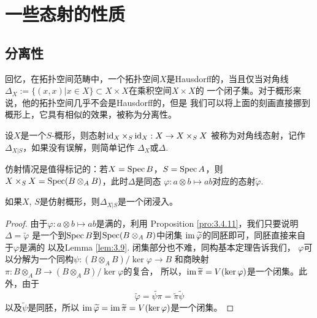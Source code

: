 
\chapter{一些态射的性质}

\section{分离性}

回忆，在拓扑空间范畴中，一个拓扑空间$X$是Hausdorff的，当且仅当对角线
$\Delta_X:=\{(x,x)|x\in X\}\subset X\times X$在乘积空间$X\times X$的
一个闭子集。对于概形来说，他的拓扑空间几乎不会是Hausdorff的，但是
我们可以将上面的刻画直接挪到概形上，它具有相似的效果，被称为分离性。

\begin{para}[对角线]
	设$X$是一个$S$-概形，则态射$\operatorname{id}_X\times_S\operatorname{id}_X:X\to X\times_S X$
	被称为对角线态射，记作$\Delta_{X|S}$，如果没有误解，则简单记作
	$\Delta_X$或$\Delta$.
\end{para}

仿射情况是值得标记的：若$X=\operatorname{Spec} B$，$S=\operatorname{Spec} A$，则
$X\times_S X=\operatorname{Spec} (B\otimes_A B)$，此时$\Delta$是同态
$\varphi:a\otimes b\mapsto ab$对应的态射$\widetilde{\varphi}$.

\begin{lem}\label{lem:4.1.2}
	如果$X$, $S$是仿射概形，则$\Delta_{X|S}$是一个闭浸入。
\end{lem}

\begin{proof}
由于$\varphi:a\otimes b\mapsto ab$是满的，利用
Proposition \ref{pro:3.4.11}，我们只要说明$\Delta=\widetilde{\varphi}$
是一个到$\operatorname{Spec} B$到$\operatorname{Spec} (B\otimes_A B)$中闭集
$\operatorname{im} \widetilde{\varphi}$的同胚即可，同胚直接来自于$\varphi$是满的
以及Lemma \ref{lem:3.9}. 闭集部分也不难，同构基本定理告诉我们，
$\varphi$可以分解为一个同构$\psi:(B\otimes_A B)/\ker \varphi\to B$
和商映射$\pi:B\otimes_A B\to (B\otimes_A B)/\ker \varphi$的复合，
所以，$\operatorname{im} \widetilde{\pi}=V(\ker \varphi)$是一个闭集。此外，由于
\[
\widetilde{\varphi}=\widetilde{\psi\pi}=\widetilde{\pi}\widetilde{\psi}
\]
以及$\widetilde{\psi}$是同胚，所以
$\operatorname{im} \widetilde{\varphi}=\operatorname{im} \widetilde{\pi}=V(\ker \varphi)$是一个闭集。
\end{proof}


